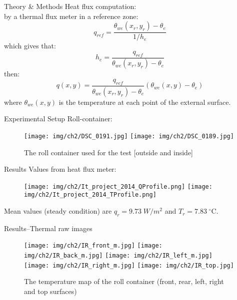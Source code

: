 \begin{frame}{Theory \& Methods}
    Heat flux computation:\\ 
    by a thermal flux meter in a reference zone:
    \begin{equation*}
        q_{ref} = \frac{\theta_{we}(x_r,y_r)-\theta_e}{1/h_e}
    \end{equation*}
    which gives that:
    \begin{equation*}
        h_e = \frac{q_{ref}}{\theta_{we}(x_r,y_r)-\theta_e}
    \end{equation*}
    then:
    \pause
    \begin{equation*}
        q(x,y) = \frac{q_{ref}}{\theta_{we}(x_r,y_r)-\theta_e}(\theta_{we}(x,y)-\theta_e)
    \end{equation*}
    where $\theta_{we}(x,y)$ is the temperature at each point of the external surface.    
\end{frame}


\begin{frame}{Experimental Setup}
Roll-container:
    \begin{figure}[!htbp]
        \centering
        \texttt{[image: img/ch2/DSC\_0191.jpg]}
        \texttt{[image: img/ch2/DSC\_0189.jpg]}
        \caption{The roll container used for the test [outside and inside]}
    \end{figure}
\end{frame}


\begin{frame}{Results}
Values from heat flux meter:
    \begin{figure}
        \hspace*{-18pt}
        \texttt{[image: img/ch2/It\_project\_2014\_QProfile.png]}
        \texttt{[image: img/ch2/It\_project\_2014\_TProfile.png]}
    \end{figure}
    \centering
    \small{Mean values (steady condition) are $q_r=9.73\; W/m^2$ and $T_r = 7.83\; ^\circ$C.}
\end{frame}


\begin{frame}{Results--\small{Thermal raw images}}
    \begin{figure}
        \vspace*{-5pt}
        \centering
        \texttt{[image: img/ch2/IR\_front\_m.jpg]}
        \hspace{5pt}
        \texttt{[image: img/ch2/IR\_back\_m.jpg]}
        \texttt{[image: img/ch2/IR\_left\_m.jpg]}
        \hspace{5pt}
        \texttt{[image: img/ch2/IR\_right\_m.jpg]}
        \texttt{[image: img/ch2/IR\_top.jpg]}
        \vspace*{-5pt}
        \caption{\footnotesize{The temperature map of the roll container (front, rear, left, right and top surfaces)}}
    \end{figure}
\end{frame}

